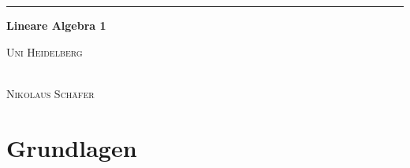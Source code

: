 \documentclass[10pt,a4paper,numbers=endperiod]{scrartcl}
\theoremstyle{definition}
\def\Namen{} %
\def\Datum{} %
\begin{document}
\Namen \hfill \Datum\par
\vspace{0.25\baselineskip}
\hrule
\vspace{\baselineskip}
\begin{center}
{\LARGE\textbf{Lineare Algebra 1}}\par
\vspace{0.25\baselineskip}
{\large\textsc{Uni Heidelberg}}
\end{center}

\vspace{\baselineskip}
\vspace{\baselineskip}
\vspace{\baselineskip}
\vspace{\baselineskip}
\vspace{\baselineskip}
\vspace{\baselineskip}
\vspace{\baselineskip}
\vspace{\baselineskip}
\vspace{\baselineskip}
\vspace{\baselineskip}
\vspace{\baselineskip}  
\vspace{\baselineskip}
\vspace{\baselineskip}
\vspace{\baselineskip}
\vspace{\baselineskip}
\vspace{\baselineskip}
\vspace{\baselineskip}
\vspace{\baselineskip}
\vspace{\baselineskip}
\vspace{\baselineskip}
\vspace{\baselineskip}

\begin{center}
	{\large{}}\\
	\vspace{0.3\baselineskip}
	{\large\textsc{Nikolaus Schäfer}}
\end{center}

\newpage
\vspace{0.125\baselineskip}
\tableofcontents %
\newpage
\section{Grundlagen}
\vspace{0.2\baselineskip}
\end{document}
